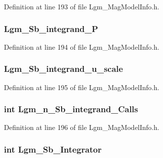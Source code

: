 Definition at line 193 of file Lgm\_\-MagModelInfo.h.\hypertarget{struct_lgm___mag_model_info_64ea881b31763fe2b1c1fc78d589dd84}{
\subsubsection[{Lgm\_\-Sb\_\-integrand\_\-P}]{ {\bf Lgm\_\-Sb\_\-integrand\_\-P}}}
\label{struct_lgm___mag_model_info_64ea881b31763fe2b1c1fc78d589dd84}




Definition at line 194 of file Lgm\_\-MagModelInfo.h.\hypertarget{struct_lgm___mag_model_info_fc1c449cd255aa38568f885b3732a699}{
\subsubsection[{Lgm\_\-Sb\_\-integrand\_\-u\_\-scale}]{ {\bf Lgm\_\-Sb\_\-integrand\_\-u\_\-scale}}}
\label{struct_lgm___mag_model_info_fc1c449cd255aa38568f885b3732a699}




Definition at line 195 of file Lgm\_\-MagModelInfo.h.\hypertarget{struct_lgm___mag_model_info_e1edd10efda316240fd228a9bab0cc24}{
\subsubsection[{Lgm\_\-n\_\-Sb\_\-integrand\_\-Calls}]{\setlength{\rightskip}{0pt plus 5cm}int {\bf Lgm\_\-n\_\-Sb\_\-integrand\_\-Calls}}}
\label{struct_lgm___mag_model_info_e1edd10efda316240fd228a9bab0cc24}




Definition at line 196 of file Lgm\_\-MagModelInfo.h.\hypertarget{struct_lgm___mag_model_info_713978104b56d5edd790199e13ee10fd}{
\subsubsection[{Lgm\_\-Sb\_\-Integrator}]{\setlength{\rightskip}{0pt plus 5cm}int {\bf Lgm\_\-Sb\_\-Integrator}}}
\label{struct_lgm___mag_model_info_713978104b56d5edd790199e13ee10fd}




